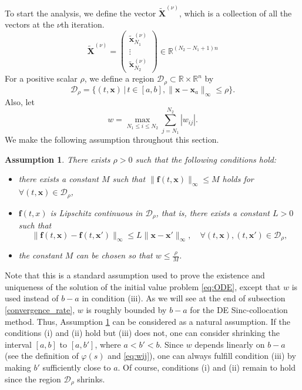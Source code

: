 \documentclass[pdflatex,sn-mathphys-num]{sn-jnl}%
\newcommand{\q}{\quad}
\theoremstyle{thmstyleone}%
\theoremstyle{thmstyletwo}%
\newtheorem{assumption}{Assumption}%
\theoremstyle{thmstylethree}%
\begin{document}
To start the analysis, we define the vector $\widetilde{\bm X}^{(\nu)}$, which is a collection of all the vectors at the $\nu$th iteration.
\begin{equation}
\widetilde{\bm X}^{(\nu)}=\left(\begin{array}{c}
\widetilde{\bm x}_{N_1}^{(\nu)} \\
\vdots \\
\widetilde{\bm x}_{N_2}^{(\nu)}
\end{array}
\right) \in\mathbb{R}^{(N_2-N_1+1)n}
\end{equation}
For a positive scalar $\rho$, we define a region $\mathcal{D}_{\rho}\subset\mathbb{R}\times\mathbb{R}^n$ by
\begin{equation}
\mathcal{D}_{\rho}=\{(t,{\bm x})\,|\,t\in[a,b], \|{\bm x}-{\bm x}_a\|_{\infty}\le\rho\}.
\end{equation}
Also, let
\begin{equation}
w = \max_{N_1\le i\le N_2}\sum_{j=N_1}^{N_2}|w_{ij}|.
\label{eq:wdef}
\end{equation}
We make the following assumption throughout this section.
\begin{assumption}
\label{Assumption3-1}
There exists $\rho>0$ such that the following conditions hold:
\begin{itemize}
\item[(i)] there exists a constant $M$ such that $\|{\bm f}(t,{\bm x})\|_{\infty}\le M$ holds for $\forall(t,{\bm x})\in\mathcal{D}_{\rho}$,
\item[(ii)] ${\bm f}(t,x)$ is Lipschitz continuous in $\mathcal{D}_{\rho}$, that is, there exists a constant $L>0$ such that
\begin{equation}
\|{\bm f}(t,{\bm x})-{\bm f}(t,{\bm x}')\|_{\infty}\le L\|{\bm x}-{\bm x}'\|_{\infty}, \q \forall(t,{\bm x}), (t,{\bm x}')\in \mathcal{D}_{\rho},
\label{eq:Lipschitz}
\end{equation}
\item[(iii)] the constant $M$ can be chosen so that $w\le \frac{\rho}{M}$.
\end{itemize}
\end{assumption}
Note that this is a standard assumption used to prove the existence and uniqueness of the solution of the initial value problem \eqref{eq:ODE}, except that $w$ is used instead of $b-a$ in condition (iii). As we will see at the end of subsection \ref{convergence_rate}, $w$ is roughly bounded by $b-a$ for the DE Sinc-collocation method. Thus, Assumption \ref{Assumption3-1} can be considered as a natural assumption. If the conditions (i) and (ii) hold but (iii) does not, one can consider shrinking the interval $[a,b]$ to $[a,b']$, where $a<b'<b$. Since $w$ depends linearly on $b-a$ (see the definition of $\varphi(s)$ and \eqref{eq:wij}), one can always fulfill condition (iii) by making $b'$ sufficiently close to $a$. Of course, conditions (i) and (ii) remain to hold since the region $\mathcal{D}_{\rho}$ shrinks.
\end{document}
